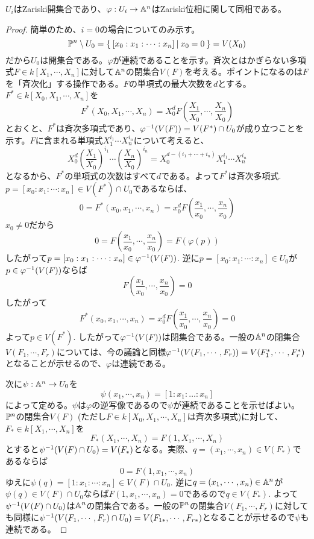 \documentclass{ltjsreport}
\begin{document}
\begin{prop}
  $U_i$はZariski開集合であり、$\varphi:U_i\rightarrow \mathbb{A}^n$はZariski位相に関して同相である。
\end{prop}

\begin{proof}
  簡単のため、$i=0$の場合についてのみ示す。
  \[
  \mathbb{P}^n\setminus U_0=\left\{\:[x_0:x_1:\cdots:x_n]\:\middle|\:x_0=0\:\right\}=V(X_0) 
  \]
  だから$U_0$は開集合である。$\varphi$が連続であることを示す。斉次とはかぎらない多項式$F\in k[X_1,\cdots,X_n]$に対して$\mathbb{A}^n$の閉集合$V(F)$を考える。ポイントになるのは$F$を「斉次化」する操作である。$F$の単項式の最大次数を$d$とする。
  $F^*\in k[X_0,X_1,\cdots,X_n]$を
  \[
  F^*(X_0,X_1,\cdots,X_n)=X_0^dF(\frac{X_1}{X_0},\cdots,\frac{X_n}{X_0})
  \]
  とおくと、$F^*$は斉次多項式であり、$\varphi^{-1}(V(F))=V(F^*)\cap U_0$が成り立つことを示す。$F$に含まれる単項式$X_1^{i_1}\cdots X_n^{i_n}$について考えると、
  \[
  X_0^d(\frac{X_1}{X_0})^{i_1}\cdots(\frac{X_n}{X_0})^{i_n}=X_0^{d-(i_1+\cdots+i_n)}X_1^{i_1}\cdots X_n^{i_n} 
  \]
  となるから、$F^*$の単項式の次数はすべて$d$である。よって$F^*$は斉次多項式. $p=[x_0:x_1:\cdots:x_n]\in V(F^*)\cap U_0$であるならば、
  \[
  0=F^*(x_0,x_1,\cdots,x_n)=x_0^dF(\frac{x_1}{x_0},\cdots,\frac{x_n}{x_0})
  \]
  $x_0\neq 0$だから
  \[
  0=F(\frac{x_1}{x_0},\cdots,\frac{x_n}{x_0})=F(\varphi(p)) 
  \]
  したがって$p=[x_0:x_1:\cdots:x_n]\in \varphi^{-1}(V(F))$. 逆に$p=[x_0:x_1:\cdots:x_n]\in U_0$が$p\in\varphi^{-1}(V(F))$ならば
  \[
  F(\frac{x_1}{x_0},\cdots,\frac{x_n}{x_0})=0
  \]
  したがって
  \[
  F^*(x_0,x_1,\cdots,x_n)=x_0^dF(\frac{x_1}{x_0},\cdots,\frac{x_n}{x_0})=0
  \]
  よって$p\in V(F^*)$. したがって$\varphi^{-1}(V(F))$は閉集合である。一般の$\mathbb{A}^n$の閉集合$V(F_1,\cdots,F_r)$については、今の議論と同様$\varphi^{-1}(V(F_1,\cdots,F_r))=V(F_1^*,\cdots,F_r^*)$となることが示せるので、$\varphi$は連続である。

  次に$\psi:\mathbb{A}^n\rightarrow U_0$を
  \[
  \psi(x_1,\cdots,x_n)=[1:x_1:\dots:x_n]  
  \]
  によって定める。$\psi$は$\varphi$の逆写像であるので$\psi$が連続であることを示せばよい。$\mathbb{P}^n$の閉集合$V(F)$ (ただし$F\in k[X_0,X_1,\cdots,X_n]$は斉次多項式)に対して、$F_*\in k[X_1,\cdots,X_n]$を
  \[
  F_*(X_1,\cdots,X_n)=F(1,X_1,\cdots,X_n)  
  \]
  とすると$\psi^{-1}(V(F)\cap U_0)=V(F_*)$となる。実際、$q=(x_1,\cdots,x_n)\in V(F_*)$であるならば
  \[
  0=F(1,x_1,\cdots,x_n)  
  \]
  ゆえに$\psi(q)=[1:x_1:\cdots:x_n]\in V(F)\cap U_0$. 逆に$q=(x_1,\cdots,x_n)\in\mathbb{A}^n$が$\psi(q)\in V(F)\cap U_0$ならば$F(1,x_1,\cdots,x_n)=0$であるので$q\in V(F_*)$. よって$\psi^{-1}(V(F)\cap U_0)$は$\mathbb{A}^n$の閉集合である。一般の$\mathbb{P}^n$の閉集合$V(F_1,\cdots,F_r)$に対しても同様に$\psi^{-1}(V(F_1,\cdots,F_r)\cap U_0)=V(F_{1*},\cdots,F_{r*})$となることが示せるので$\psi$も連続である。
\end{proof}
\end{document}
